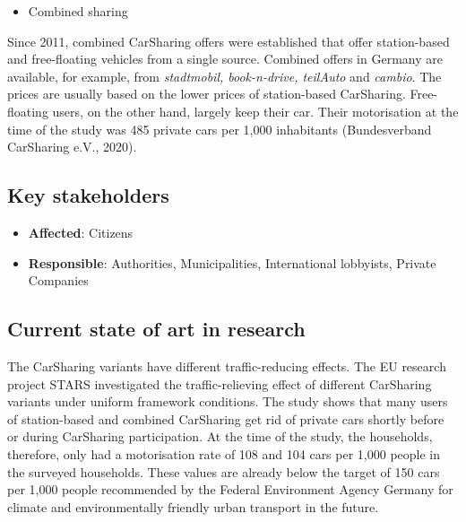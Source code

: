 \documentclass[
]{book}
\providecommand{\tightlist}{%
  \setlength{\itemsep}{0pt}\setlength{\parskip}{0pt}}
\begin{document}
\begin{itemize}
\tightlist
\item
  Combined sharing
\end{itemize}

Since 2011, combined CarSharing offers were established that offer station-based and free-floating vehicles from a single source. Combined offers in Germany are available, for example, from \emph{stadtmobil, book-n-drive, teilAuto} and \emph{cambio}. The prices are usually based on the lower prices of station-based CarSharing.
Free-floating users, on the other hand, largely keep their car. Their motorisation at the time of the study was 485 private cars per 1,000 inhabitants (Bundesverband CarSharing e.V., 2020).

\hypertarget{key-stakeholders-31}{%
\subsection*{Key stakeholders}\label{key-stakeholders-31}}

\begin{itemize}
\tightlist
\item
  \textbf{Affected}: Citizens
\item
  \textbf{Responsible}: Authorities, Municipalities, International lobbyists, Private Companies
\end{itemize}

\hypertarget{current-state-of-art-in-research-31}{%
\subsection*{Current state of art in research}\label{current-state-of-art-in-research-31}}

The CarSharing variants have different traffic-reducing effects. The EU research project STARS investigated the traffic-relieving effect of different CarSharing variants under uniform framework conditions. The study shows that many users of station-based and combined CarSharing get rid of private cars shortly before or during CarSharing participation. At the time of the study, the households, therefore, only had a motorisation rate of 108 and 104 cars per 1,000 people in the surveyed households. These values are already below the target of 150 cars per 1,000 people recommended by the Federal Environment Agency Germany for climate and environmentally friendly urban transport in the future.
\end{document}
